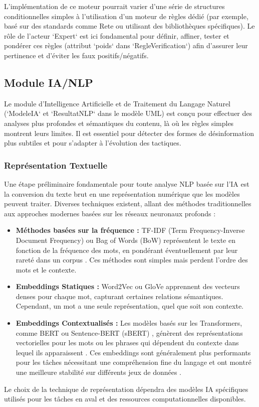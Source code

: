 \documentclass[9pt,twocolumn,french]{article}
\begin{document}
L'implémentation de ce moteur pourrait varier d'une série de structures conditionnelles simples à l'utilisation d'un moteur de règles dédié (par exemple, basé sur des standards comme Rete ou utilisant des bibliothèques spécifiques). Le rôle de l'acteur `Expert` est ici fondamental pour définir, affiner, tester et pondérer ces règles (attribut `poids` dans `RegleVerification`) afin d'assurer leur pertinence et d'éviter les faux positifs/négatifs.

\subsection{Module IA/NLP}

Le module d'Intelligence Artificielle et de Traitement du Langage Naturel (`ModeleIA` et `ResultatNLP` dans le modèle UML) est conçu pour effectuer des analyses plus profondes et sémantiques du contenu, là où les règles simples montrent leurs limites. Il est essentiel pour détecter des formes de désinformation plus subtiles et pour s'adapter à l'évolution des tactiques.

\subsubsection{Représentation Textuelle}
Une étape préliminaire fondamentale pour toute analyse NLP basée sur l'IA est la conversion du texte brut en une représentation numérique que les modèles peuvent traiter. Diverses techniques existent, allant des méthodes traditionnelles aux approches modernes basées sur les réseaux neuronaux profonds \citep{Ahmed2025Aidriven, Hagag2023The, Mikolov2020Efficient, Pennington2014Glove, Li2014A} :
\begin{itemize}
    \item \textbf{Méthodes basées sur la fréquence :} TF-IDF (Term Frequency-Inverse Document Frequency) ou Bag of Words (BoW) représentent le texte en fonction de la fréquence des mots, en pondérant éventuellement par leur rareté dans un corpus \citep{Hagag2023The}. Ces méthodes sont simples mais perdent l'ordre des mots et le contexte.
    \item \textbf{Embeddings Statiques :} Word2Vec \citep{Mikolov2020Efficient} ou GloVe \citep{Ahmed2025Aidriven, Hagag2023The, Pennington2014Glove} apprennent des vecteurs denses pour chaque mot, capturant certaines relations sémantiques. Cependant, un mot a une seule représentation, quel que soit son contexte.
    \item \textbf{Embeddings Contextualisés :} Les modèles basés sur les Transformers, comme BERT \citep{Zhou2022A, Li2021Debunking, Shah2024Decoding} ou Sentence-BERT (sBERT) \citep{Hagag2023The}, génèrent des représentations vectorielles pour les mots ou les phrases qui dépendent du contexte dans lequel ils apparaissent \citep{Loth2024}. Ces embeddings sont généralement plus performants pour les tâches nécessitant une compréhension fine du langage et ont montré une meilleure stabilité sur différents jeux de données \citep{Hagag2023The}.
\end{itemize}
Le choix de la technique de représentation dépendra des modèles IA spécifiques utilisés pour les tâches en aval et des ressources computationnelles disponibles.
\end{document}

